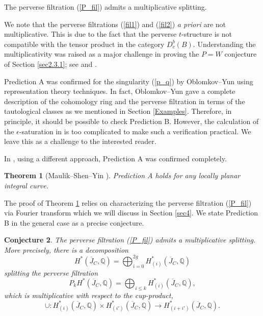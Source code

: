 \documentclass{pspum-l}
\theoremstyle{plain}
\newtheorem{thm}{Theorem}[section]
\newtheorem{conj}[thm]{Conjecture}
\theoremstyle{definition}
\theoremstyle{remark}
\newcommand{\BQ}{{\mathbb{Q}}}
\begin{document}
\medskip

 The perverse filtration (\ref{P_fil}) admits a multiplicative splitting.

\medskip

We note that the perverse filtrations (\ref{fil1}) and (\ref{fil2}) \emph{a priori} are not multiplicative. This is due to the fact that the perverse $t$-structure is not compatible with the tensor product in the category $D^b_c(B)$. Understanding the multiplicativity was raised as a major challenge in proving the $P=W$ conjecture of Section \ref{sec2.3.1}; see \cite[Section 1]{dCHM} and \cite[Theorem 0.6]{dCMS}.






Prediction A was confirmed for the singularity (\ref{p_q}) by Oblomkov--Yun \cite{OY,OY2} using representation theory techniques. In fact, Oblomkov--Yun \cite{OY2} gave a complete description of the cohomology ring and the perverse filtration in terms of the tautological classes as we mentioned in Section \ref{Examples}. Therefore, in principle, it should be possible to check Prediction B. However, the calculation of the $\epsilon$-saturation in \cite[Theorem 1.1.3]{OY2} is too complicated to make such a verification practical. We leave this as a challenge to the interested reader.





In \cite{MSY}, using a different approach, Prediction A was confirmed completely.

\begin{thm}[Maulik--Shen--Yin \cite{MSY}]\label{thm2.6}
    Prediction A holds for any locally planar integral curve.
\end{thm}

The proof of Theorem \ref{thm2.6} relies on characterizing the perverse filtration (\ref{P_fil}) via Fourier transform which we will discuss in Section \ref{sec4}. We state Prediction B in the general case as a precise conjecture.

\begin{conj}\label{conj2.7}
    The perverse filtration (\ref{P_fil}) admits a multiplicative splitting. More precisely, there is a decomposition
    \[
    H^*(\overline{J}_C, \BQ)=\bigoplus_{i=0}^{2g} H^*_{(i)}(\overline{J}_C, \BQ)
    \]
    splitting the perverse filtration
    \[
    P_kH^*(\overline{J}_C, \BQ) = \bigoplus_{i\leq k} H_{(i)}^*(\overline{J}_C, \BQ),
    \]
    which is multiplicative with respect to the cup-product,
    \[
    \cup: H_{(i)}^*(\overline{J}_C, \BQ) \times H_{(i')}^*(\overline{J}_C, \BQ) \to H_{(i+i')}^*(\overline{J}_C, \BQ).     \]
\end{conj}
\end{document}
